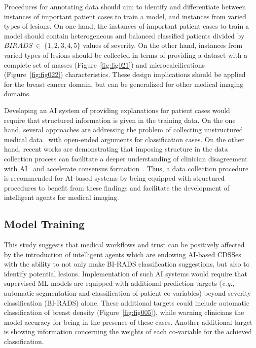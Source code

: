 Procedures for annotating data should aim to identify and differentiate between instances of important patient cases to train a model, and instances from varied types of lesions.
On one hand, the instances of important patient cases to train a model should contain heterogeneous and balanced classified patients divided by $BIRADS~\in~\{1, 2, 3, 4, 5\}$ values of severity.
On the other hand, instances from varied types of lesions should be collected in terms of providing a dataset with a complete set of masses (Figure~\ref{fig:fig021}) and microcalcifications (Figure~\ref{fig:fig022}) characteristics.
These design implications should be applied for the breast cancer domain, but can be generalized for other medical imaging domains.

Developing an \ac{AI} system of providing explanations for patient cases would require that structured information is given in the training data.
On the one hand, several approaches are addressing the problem of collecting unstructured medical data~\cite{10.1145/3308560.3317085, SchaekermannMike2020} with open-ended arguments for classification cases.
On the other hand, recent works are demonstrating that imposing structure in the data collection process can facilitate a deeper understanding of clinician disagreement with \ac{AI}~\cite{10.1145/3308560.3317085} and accelerate consensus formation~\cite{10.1145/3313831.3376506}.
Thus, a data collection procedure is recommended for \ac{AI}-based systems by being equipped with structured procedures to benefit from these findings and facilitate the development of intelligent agents for medical imaging.

\subsection{Model Training}
\label{sec:sec007004002}

This study suggests that medical workflows and trust can be positively affected by the introduction of intelligent agents which are endowing \ac{AI}-based \acp{CDSSe} with the ability to not only make \ac{BI-RADS} classification suggestions, but also to identify potential lesions.
Implementation of such \ac{AI} systems would require that supervised \ac{ML} models are equipped with additional prediction targets ({\it e.g.}, automatic segmentation and classification of patient co-variables) beyond severity classification (\ac{BI-RADS}) alone.
These additional targets could include automatic classification of breast density (Figure~\ref{fig:fig005}), while warning clinicians the model accuracy for being in the presence of these cases.
Another additional target is showing information concerning the weights of each co-variable for the achieved classification.


